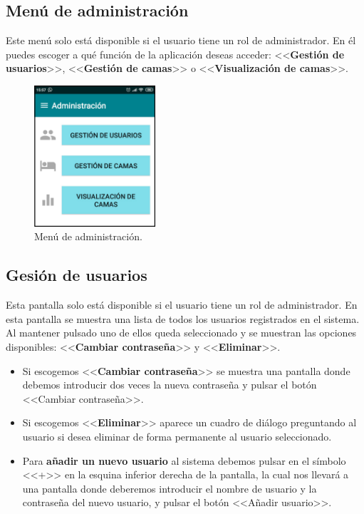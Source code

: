 \subsection{Menú de administración}

Este menú solo está disponible si el usuario tiene un rol de administrador. En él puedes escoger a qué función de la aplicación deseas acceder: <<\textbf{Gestión de usuarios}>>, <<\textbf{Gestión de camas}>> o <<\textbf{Visualización de camas}>>. 

\begin{figure}[H]
	\centering
	\includegraphics[width=0.4\textwidth]{../img/menudeadministracion.png}
	\caption{Menú de administración.}
	\label{fig:menudeadministracion}
\end{figure}

\subsection{Gesión de usuarios}

Esta pantalla solo está disponible si el usuario tiene un rol de administrador. En esta pantalla se muestra una lista de todos los usuarios registrados en el sistema. Al mantener pulsado uno de ellos queda seleccionado y se muestran las opciones disponibles: <<\textbf{Cambiar contraseña}>> y <<\textbf{Eliminar}>>.

\begin{itemize}
	\item Si escogemos <<\textbf{Cambiar contraseña}>> se muestra una pantalla donde debemos introducir dos veces la nueva contraseña y pulsar el botón <<Cambiar contraseña>>.
	\item Si escogemos <<\textbf{Eliminar}>> aparece un cuadro de diálogo preguntando al usuario si desea eliminar de forma permanente al usuario seleccionado. 
	\item Para \textbf{añadir un nuevo usuario} al sistema debemos pulsar en el símbolo <<+>> en la esquina inferior derecha de la pantalla, la cual nos llevará a una pantalla donde deberemos introducir el nombre de usuario y la contraseña del nuevo usuario, y pulsar el botón <<Añadir usuario>>. 
\end{itemize}  

